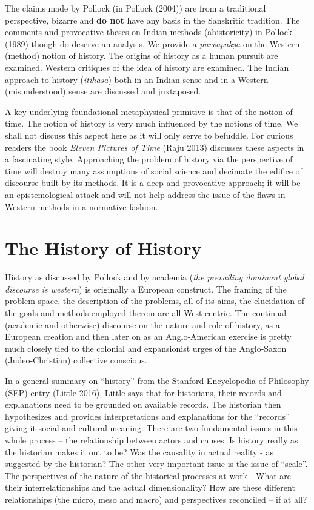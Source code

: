 \vskip -5pt

The claims made by Pollock (in Pollock (2004)) are from a traditional perspective, bizarre and \textbf{do not} have any basis in the Sanskritic tradition. The comments and provocative theses on Indian methods (ahistoricity) in Pollock (1989) though do deserve an analysis. We provide a \textit{pūrvapakṣa} on the Western (method) notion of history. The origins of history as a human pursuit are examined. Western critiques of the idea of history are examined. The Indian approach to history (\textit{itihāsa}) both in an Indian sense and in a Western (misunderstood) sense are discussed and juxtaposed.

A key underlying foundational metaphysical primitive is that of the notion of time. The notion of history is very much influenced by the notions of time. We shall not discuss this aspect here as it will only serve to befuddle. For curious readers the book \textit{Eleven Pictures of Time} (Raju 2013) discusses these aspects in a fascinating style. Approaching the problem of history via the perspective of time will destroy many assumptions of social science and decimate the edifice of discourse built by its methods. It is a deep and provocative approach; it will be an epistemological attack and will not help address the issue of the flaws in Western methods in a normative fashion.


\section*{The History of History}

\vskip -5pt

History as discussed by Pollock and by academia (\textit{the prevailing dominant global discourse is western}) is originally a European construct. The framing of the problem space, the description of the problems, all of its aims, the elucidation of the goals and methods employed therein are all West-centric. The continual (academic and otherwise) discourse on the nature and role of history, as a European creation and then later on as an Anglo-American exercise is pretty much closely tied to the colonial and expansionist urges of the Anglo-Saxon (Judeo-Christian) collective conscious.

In a general summary on “history” from the Stanford Encyclopedia of Philosophy (SEP) entry (Little 2016), Little says that for historians, their records and explanations need to be grounded on available records. The historian then hypothesizes and provides interpretations and explanations for the “records” giving it social and cultural meaning. There are two fundamental issues in this whole process – the relationship between actors and causes. Is history really as the historian makes it out to be? Was the causality in actual reality - as suggested by the historian? The other very important issue is the issue of “scale”. The perspectives of the nature of the historical processes at work - What are their interrelationships and the actual dimensionality? How are these different relationships (the micro, meso and macro) and perspectives reconciled – if at all?

